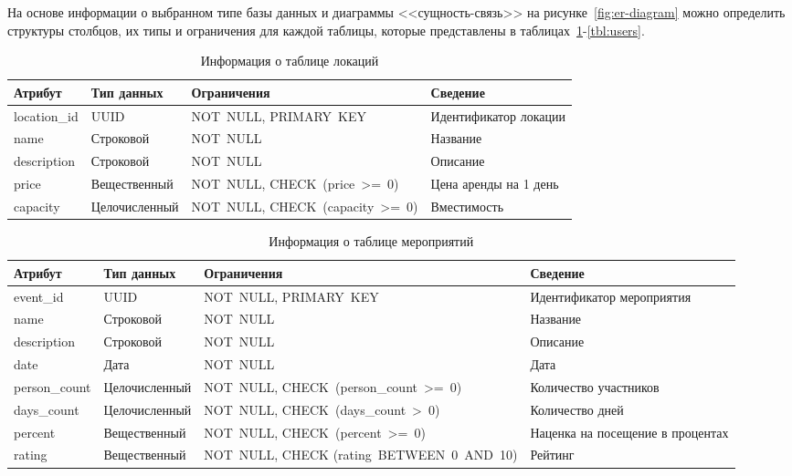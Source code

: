 На основе информации о выбранном типе базы данных и диаграммы <<сущность-связь>> на рисунке~\ref{fig:er-diagram} можно определить структуры столбцов, их типы и ограничения для каждой таблицы, которые представлены в таблицах~\ref{tbl:locations}-\ref{tbl:users}.

\begin{table}[h!]
	\centering
	\caption{Информация о таблице локаций}
	\begin{tabularx}{\textwidth}{|p{2.6cm}|X|p{6cm}|X|}
		\hline
		\textbf{Атрибут} & \textbf{Тип данных} & \textbf{Ограничения} & \textbf{Сведение} \\
		\hline
		location\_id & UUID & NOT~NULL, \newline PRIMARY~KEY & Идентификатор локации \\
		\hline
		name & Строковой & NOT~NULL & Название \\
		\hline
		description & Строковой & NOT~NULL & Описание \\
		\hline
		price & Вещественный & NOT~NULL, \newline CHECK~(price~>=~0) & Цена аренды на 1 день \\
		\hline
		capacity & Целочисленный & NOT~NULL, \newline CHECK~(capacity~>=~0) & Вместимость \\
		\hline
	\end{tabularx}
	\label{tbl:locations}
\end{table}

\begin{table}[h!]
	\centering
	\caption{Информация о таблице мероприятий}
	\begin{tabularx}{\textwidth}{|p{2.6cm}|X|p{6cm}|X|}
		\hline
		\textbf{Атрибут} & \textbf{Тип данных} & \textbf{Ограничения} & \textbf{Сведение} \\
		\hline
		event\_id & UUID & NOT~NULL, \newline PRIMARY~KEY & Идентификатор мероприятия \\
		\hline
		name & Строковой & NOT~NULL & Название \\
		\hline
		description & Строковой & NOT~NULL & Описание \\
		\hline
		date & Дата & NOT~NULL & Дата \\
		\hline
		person\_count & Целочисленный & NOT~NULL, \newline CHECK~(person\_count~>=~0) & Количество участников \\
		\hline
		days\_count & Целочисленный & NOT~NULL, \newline CHECK~(days\_count~>~0) & Количество дней \\
		\hline
		percent & Вещественный & NOT~NULL, \newline CHECK~(percent~>=~0) & Наценка на посещение в процентах \\
		\hline
		rating & Вещественный & NOT~NULL, \newline CHECK (rating~BETWEEN~0~AND~10) & Рейтинг \\
		\hline
	\end{tabularx}
	\label{tbl:events}
\end{table}

